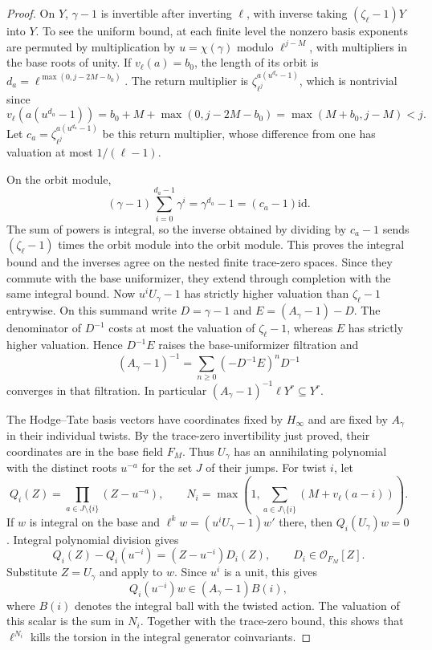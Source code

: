 \begin{proof}
On \(Y\), \(\gamma-1\) is invertible after inverting
\(\ell\), with inverse taking \((\zeta_\ell-1)Y\)
into \(Y\). To see the uniform bound, at each finite
level the nonzero basis exponents are permuted by
multiplication by \(u=\chi(\gamma)\) modulo
\(\ell^{j-M}\), with multipliers in the base roots of
unity. If \(v_\ell(a)=b_0\), the length of its orbit
is \(d_a=\ell^{\max(0,j-2M-b_0)}\). The return multiplier
is \(\zeta_{\ell^j}^{a(u^{d_a}-1)}\), which is nontrivial
since
\[
 v_\ell(a(u^{d_a}-1))=b_0+M+\max(0,j-2M-b_0)=\max(M+b_0,j-M)<j.
\]
Let \(c_a=\zeta_{\ell^j}^{a(u^{d_a}-1)}\) be this
return multiplier, whose difference from one has valuation
at most \(1/(\ell-1)\).

On the orbit module,
\[
   (\gamma-1)\sum_{i=0}^{d_a-1}\gamma^i
                          =\gamma^{d_a}-1=(c_a-1)\mathrm{id}.
\]
The sum of powers is integral, so the inverse obtained by
dividing by \(c_a-1\) sends \((\zeta_\ell-1)\) times
the orbit module into the orbit module. This proves the
integral bound and the inverses agree on the nested
finite trace-zero spaces. Since they commute with
the base uniformizer, they extend through completion
with the same integral bound. Now
\(u^iU_\gamma-1\) has strictly higher valuation than
\(\zeta_\ell-1\) entrywise. On this summand write \(D=\gamma-1\) and \(E=(A_\gamma-1)-D\).
The denominator of \(D^{-1}\) costs at most the valuation of
\(\zeta_\ell-1\), whereas \(E\) has strictly higher valuation. Hence
\(D^{-1}E\) raises the base-uniformizer filtration and
\[
 (A_\gamma-1)^{-1}=\sum_{n\ge0}(-D^{-1}E)^nD^{-1}
\]
converges in that filtration. In particular
\((A_\gamma-1)^{-1}\ell Y^r\subseteq Y^r\).

The Hodge--Tate basis vectors have coordinates fixed
by \(H_\infty\) and are fixed by \(A_\gamma\)
in their individual twists. By the trace-zero
invertibility just proved, their coordinates are
in the base field \(F_M\). Thus \(U_\gamma\) has
an annihilating polynomial with the distinct roots
\(u^{-a}\) for the set \(J\) of their jumps.
For twist \(i\), let
\[
 Q_i(Z)=\prod_{a\in J\setminus\{i\}}(Z-u^{-a}),\qquad
 N_i=\max\left(1,\sum_{a\in J\setminus\{i\}}
                   (M+v_\ell(a-i))\right).
\]
If \(w\) is integral on the base and
\(\ell^k w=(u^iU_\gamma-1)w'\) there, then
\(Q_i(U_\gamma)w=0\).
Integral polynomial division gives
\[
 Q_i(Z)-Q_i(u^{-i})=(Z-u^{-i})D_i(Z),\qquad D_i\in \mathcal O_{F_M}[Z].
\]
Substitute \(Z=U_\gamma\) and apply to \(w\). Since \(u^i\) is a unit, this gives
\[
 Q_i(u^{-i})w\in(A_\gamma-1)B(i),
\] where \(B(i)\) denotes the integral ball with the twisted action. The valuation of this scalar is the sum in \(N_i\). Together with the trace-zero
bound, this shows that \(\ell^{N_i}\) kills the
torsion in the integral generator coinvariants.


\end{proof}
